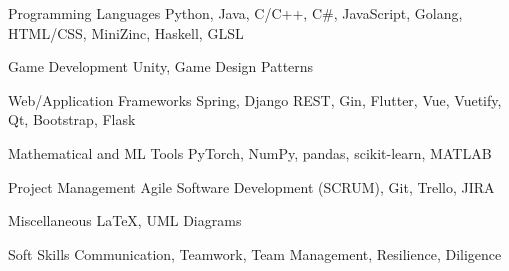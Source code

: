 

\begin{cvskills}

  \cvskill
    {Programming Languages} %
    {Python, Java, C/C++, C\#, JavaScript, Golang, HTML/CSS, MiniZinc, Haskell, GLSL} %

  \cvskill
    {Game Development} %
    {Unity, Game Design Patterns} %

  \ifbool{FullVersion}{
    \cvskill
        {GPU Programming Frameworks} %
        {CUDA and OpenACC} %
    
    \cvskill
        {Graphics Libraries} %
        {OpenGL, GLUT, GLFW, GLEW, SDL} %
  }{    
   \cvskill
    {Graphics and GPU Libraries} %
    {OpenGL, GLUT, GLFW, SDL, CUDA} %
  }


        

  \cvskill
    {Web/Application Frameworks} %
    {Spring, Django REST, Gin, Flutter, Vue, Vuetify, Qt, Bootstrap, Flask} %


  \cvskill
    {Mathematical and ML Tools} %
    {PyTorch, NumPy, pandas, scikit-learn, MATLAB} %

  \cvskill
    {Project Management} %
    {Agile Software Development (SCRUM), Git, Trello, JIRA} %

  \cvskill
    {Miscellaneous} %
    {\LaTeX \space, UML Diagrams} %

  \cvskill
    {Soft Skills} %
    {Communication, Teamwork, Team Management, Resilience, Diligence} %

\end{cvskills}

